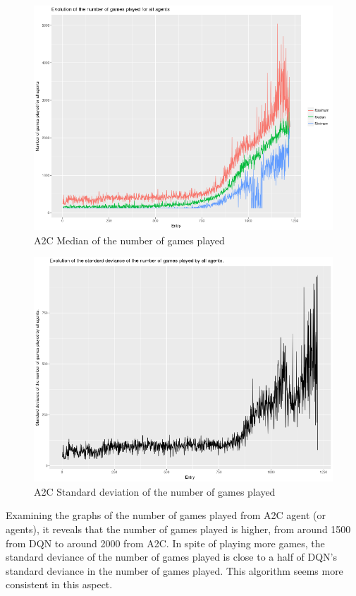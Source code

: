 \documentclass[11pt,twoside,a4paper]{article}
\begin{document}
\begin{figure}[H]
  \includegraphics[scale=0.35]{log-analysis/a2c-median-ngp.png}
  \centering
  \caption{A2C Median of the number of games played}
  \label{fig:a2c-median-ngp}
\end{figure}

\begin{figure}[H]
  \includegraphics[scale=0.35]{log-analysis/a2c-sd-ngp.png}
  \centering
  \caption{A2C Standard deviation of the number of games played}
  \label{fig:a2c-sd-ngp}
\end{figure}

Examining the graphs of the number of games played from A2C agent (or agents),
it reveals that the number of games played is higher, from around 1500 from DQN
to around 2000 from A2C. In spite of playing more games, the standard deviance
of the number of games played is close to a half of DQN's standard deviance in
the number of games played. This algorithm seems more consistent in this aspect.
\end{document}
